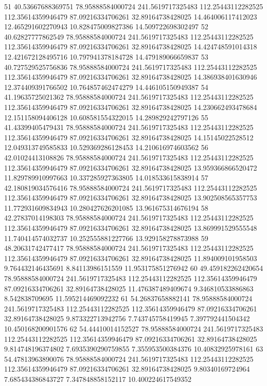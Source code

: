 {51 40.53667688369751 78.95888584000724 241.5619717325483 112.25443112282525 112.35614359946479 87.09216334706261 32.89164738428025 14.464006117412023 12.465291602270943 10.828475009827386 14.509722698302497
52 40.62827777862549 78.95888584000724 241.5619717325483 112.25443112282525 112.35614359946479 87.09216334706261 32.89164738428025 14.424748591014318 12.421672128495716 10.797941378184728 14.479189066659837
53 40.727529525756836 78.95888584000724 241.5619717325483 112.25443112282525 112.35614359946479 87.09216334706261 32.89164738428025 14.386938401630946 12.374409391766502 10.764857462474279 14.446105150949387
54 41.19635725021362 78.95888584000724 241.5619717325483 112.25443112282525 112.35614359946479 87.09216334706261 32.89164738428025 14.230662493478684 12.151158094406128 10.608581554322015 14.289829242797126
55 41.43399405479431 78.95888584000724 241.5619717325483 112.25443112282525 112.35614359946479 87.09216334706261 32.89164738428025 14.15145022528512 12.049313749585833 10.529369286128453 14.210616974603562
56 42.01024413108826 78.95888584000724 241.5619717325483 112.25443112282525 112.35614359946479 87.09216334706261 32.89164738428025 13.959366866520472 11.829789910997663 10.337285927363805 14.018533615838914
57 42.180819034576416 78.95888584000724 241.5619717325483 112.25443112282525 112.35614359946479 87.09216334706261 32.89164738428025 13.902508565357753 11.772931609834943 10.280427626201085 13.961675314676194
58 42.27837014198303 78.95888584000724 241.5619717325483 112.25443112282525 112.35614359946479 87.09216334706261 32.89164738428025 13.869991529555548 11.740414574032737 10.252555881227766 13.929158278873988
59 48.20631742477417 78.95888584000724 241.5619717325483 112.25443112282525 112.35614359946479 87.09216334706261 32.89164738428025 11.894009101958503 9.764432146435691 8.84113986151559 11.953175851276942
60 49.459182262420654 78.95888584000724 241.5619717325483 112.25443112282525 112.35614359946479 87.09216334706261 32.89164738428025 11.476387489409674 9.346810533886863 8.542838709695 11.595214469092232
61 54.26837658882141 78.95888584000724 241.5619717325483 112.25443112282525 112.35614359946479 87.09216334706261 32.89164738428025 9.873322713942756 7.743745758419945 7.397792441504342 10.450168200901576
62 54.44410014152527 78.95888584000724 241.5619717325483 112.25443112282525 112.35614359946479 87.09216334706261 32.89164738428025 9.814748196374802 7.6935390290759855 7.355953500384376 10.40832925978161
63 54.47813963890076 78.95888584000724 241.5619717325483 112.25443112282525 112.35614359946479 87.09216334706261 32.89164738428025 9.80340169724964 7.685434386843727 7.347848858152117 10.400224617549352
}
